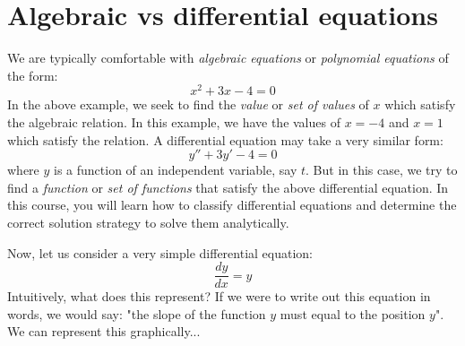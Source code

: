 \section{Algebraic vs differential equations}
We are typically comfortable with \emph{algebraic equations} or  \emph{polynomial equations}  of the form:
\begin{equation}
x^2+3x-4=0
\end{equation}
In the above example, we seek to find the \emph{value} or \emph{set of values} of $x$ which satisfy the algebraic relation. In this example, we have the values of $x=-4$ and $x=1$ which satisfy the relation.
A differential equation may take a very similar form:
\begin{equation}
y''+3y'-4=0
\end{equation}
where $y$ is a function of an independent variable, say $t$. But in this case, we try to find a \emph{function} or \emph{set of functions} that satisfy the above differential equation. In this course, you will learn how to classify differential equations and determine the correct solution strategy to solve them analytically.

Now, let us consider a very simple differential equation:
\begin{equation}
\frac{d y}{dx}=y
\end{equation}
Intuitively, what does this represent? If we were to write out this equation in words, we would say: "the slope of the function $y$ must equal to the position $y$". We can represent this graphically...

